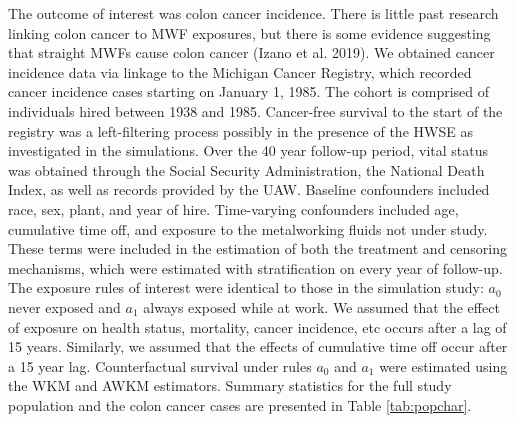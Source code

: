 \documentclass[
  11pt,
]{article}
\begin{document}
The outcome of interest was colon cancer incidence. There is little past
research linking colon cancer to MWF exposures, but there is some
evidence suggesting that straight MWFs cause colon cancer (Izano et al.
2019). We obtained cancer incidence data via linkage to the Michigan
Cancer Registry, which recorded cancer incidence cases starting on
January 1, 1985. The cohort is comprised of individuals hired between
1938 and 1985. Cancer-free survival to the start of the registry was a
left-filtering process possibly in the presence of the HWSE as
investigated in the simulations. Over the 40 year follow-up period,
vital status was obtained through the Social Security Administration,
the National Death Index, as well as records provided by the UAW.
Baseline confounders included race, sex, plant, and year of hire.
Time-varying confounders included age, cumulative time off, and exposure
to the metalworking fluids not under study. These terms were included in
the estimation of both the treatment and censoring mechanisms, which
were estimated with stratification on every year of follow-up. The
exposure rules of interest were identical to those in the simulation
study: \(a_0\) never exposed and \(a_1\) always exposed while at work.
We assumed that the effect of exposure on health status, mortality,
cancer incidence, etc occurs after a lag of 15 years. Similarly, we
assumed that the effects of cumulative time off occur after a 15 year
lag. Counterfactual survival under rules \(a_0\) and \(a_1\) were
estimated using the WKM and AWKM estimators. Summary statistics for the
full study population and the colon cancer cases are presented in Table
\ref{tab:popchar}.
\end{document}
